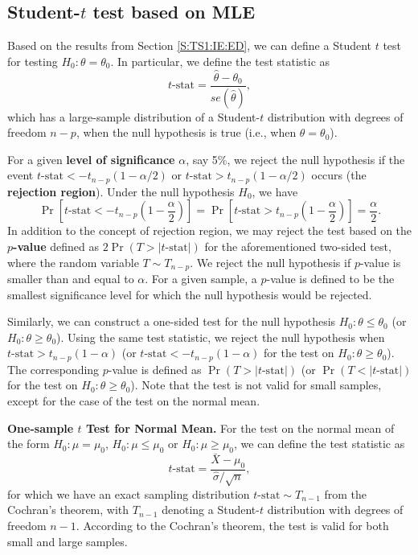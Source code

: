 \documentclass[]{book}
\theoremstyle{definition}
\theoremstyle{definition}
\theoremstyle{definition}
\theoremstyle{remark}
\begin{document}
\subsection{\texorpdfstring{Student-\(t\) test based on
MLE}{Student-t test based on MLE}}\label{student-t-test-based-on-mle}

Based on the results from Section \ref{S:TS1:IE:ED}, we can define a
Student \(t\) test for testing \(H_0:\theta=\theta_0\). In particular,
we define the test statistic as
\[t\text{-stat}=\frac{\hat{\theta}-\theta_0}{se(\hat{\theta})},\] which
has a large-sample distribution of a Student-\(t\) distribution with
degrees of freedom \({n-p}\), when the null hypothesis is true (i.e.,
when \(\theta=\theta_0\)).

For a given \textbf{level of significance} \(\alpha\), say 5\%, we
reject the null hypothesis if the event
\(t\text{-stat}<-t_{n-p}\left(1-{\alpha}/{2}\right)\) or
\(t\text{-stat}> t_{n-p}\left(1-{\alpha}/{2}\right)\) occurs (the
\textbf{rejection region}). Under the null hypothesis \(H_0\), we have
\[\Pr\left[t\text{-stat}<-t_{n-p}\left(1-\frac{\alpha}{2}\right)\right]=\Pr\left[t\text{-stat}> t_{n-p}\left(1-\frac{\alpha}{2}\right) \right]= \frac{\alpha}{2}.\]
In addition to the concept of rejection region, we may reject the test
based on the \(p\)\textbf{-value} defined as \(2\Pr(T>|t\text{-stat}|)\)
for the aforementioned two-sided test, where the random variable
\(T\sim T_{n-p}\). We reject the null hypothesis if \(p\)-value is
smaller than and equal to \(\alpha\). For a given sample, a \(p\)-value
is defined to be the smallest significance level for which the null
hypothesis would be rejected.

Similarly, we can construct a one-sided test for the null hypothesis
\(H_0:\theta\leq\theta_0\) (or \(H_0:\theta\geq\theta_0\)). Using the
same test statistic, we reject the null hypothesis when
\(t\text{-stat}> t_{n-p}\left(1-{\alpha}\right)\) (or
\(t\text{-stat}<- t_{n-p}\left(1-{\alpha}\right)\) for the test on
\(H_0:\theta\geq\theta_0\)). The corresponding \(p\)-value is defined as
\(\Pr(T>|t\text{-stat}|)\) (or \(\Pr(T<|t\text{-stat}|)\) for the test
on \(H_0:\theta\geq\theta_0\)). Note that the test is not valid for
small samples, except for the case of the test on the normal mean.

\textbf{One-sample \(t\) Test for Normal Mean.} For the test on the
normal mean of the form \(H_0:\mu=\mu_0\), \(H_0:\mu\leq\mu_0\) or
\(H_0:\mu\geq\mu_0\), we can define the test statistic as
\[t\text{-stat}=\frac{\bar{X}-\mu_0}{{\hat{\sigma}}/{\sqrt{n}}},\] for
which we have an exact sampling distribution
\(t\text{-stat}\sim T_{n-1}\) from the Cochran's theorem, with
\(T_{n-1}\) denoting a Student-\(t\) distribution with degrees of
freedom \(n-1\). According to the Cochran's theorem, the test is valid
for both small and large samples.
\end{document}
